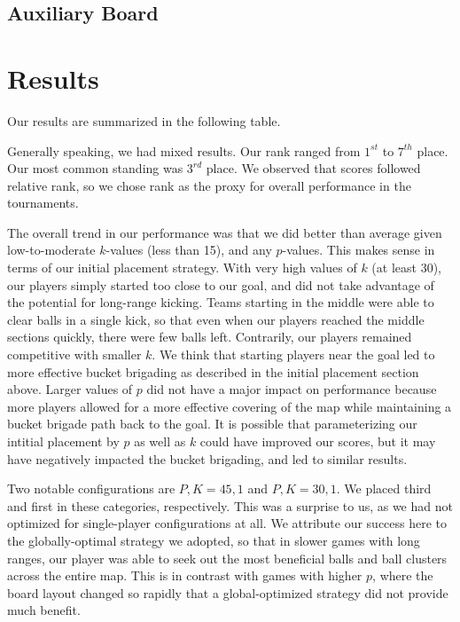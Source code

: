 \documentclass[
10pt, %
letterpaper, %
oneside, %
headinclude,footinclude, %
english
]{article}
\begin{document}
\subsection {Auxiliary Board}

\section{Results}
Our results are summarized in the following table.

Generally speaking, we had mixed results. Our rank ranged from $1^{st}$ to $7^{th}$ place. Our most common standing was $3^{rd}$ place. We observed that scores followed relative rank, so we chose rank as the proxy for overall performance in the tournaments.

The overall trend in our performance was that we did better than average given low-to-moderate $k$-values (less than 15), and any $p$-values. This makes sense in terms of our initial placement strategy. With very high values of $k$ (at least 30), our players simply started too close to our goal, and did not take advantage of the potential for long-range kicking. Teams starting in the middle were able to clear balls in a single kick, so that even when our players reached the middle sections quickly, there were few balls left. Contrarily, our players remained competitive with smaller $k$. We think that starting players near the goal led to more effective bucket brigading as described in the initial placement section above. Larger values of $p$ did not have a major impact on performance because more players allowed for a more effective covering of the map while maintaining a bucket brigade path back to the goal. It is possible that parameterizing our intitial placement by $p$ as well as $k$ could have improved our scores, but it may have negatively impacted the bucket brigading, and led to similar results.

Two notable configurations are $P,K=45,1$ and $P,K=30,1$. We placed third and first in these categories, respectively. This was a surprise to us, as we had not optimized for single-player configurations at all. We attribute our success here to the globally-optimal strategy we adopted, so that in slower games with long ranges, our player was able to seek out the most beneficial balls and ball clusters across the entire map. This is in contrast with games with higher $p$, where the board layout changed so rapidly that a global-optimized strategy did not provide much benefit. 
\end{document}
